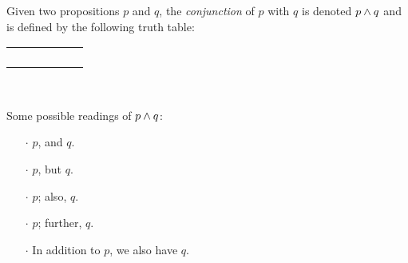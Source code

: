 \begin{definition}[Conjunction]
    \begin{center}
        \begin{minipage}[t]{.55\linewidth}
            Given two propositions \(p\) and \(q\), the \emph{conjunction} of \(p\) with \(q\)
            is denoted \(p \wedge q\) and is defined by the following truth table:
            \begin{table}[H]
                \centering
                \label{tab:and}
                \begin{tabular}{|CcCc||Cc|}
                    \hline
                     &  &  \\ \hline
                    \thead{\(\top\)} & \thead{\(\top\)} &  \\
                    \thead{\(\top\)} & \thead{\(\bot\)} &  \\
                    \thead{\(\bot\)} & \thead{\(\top\)} &  \\
                    \thead{\(\bot\)} & \thead{\(\bot\)} &  \\ \hline
                \end{tabular}
            \end{table}
        \end{minipage}%
        \begin{minipage}[t]{.05\linewidth}
            ~
        \end{minipage}%
        \begin{minipage}[t]{.4\linewidth}
            Some possible readings of \(p \wedge q\):\\
            \begin{itemize}
                \item[\(\cdot\)]
                    \(p\), and \(q\).
                \item[\(\cdot\)]
                    \(p\), but \(q\).
                \item[\(\cdot\)]
                    \(p\); also, \(q\).
                \item[\(\cdot\)]
                    \(p\); further, \(q\).
                \item[\(\cdot\)]
                    In addition to \(p\), we also have \(q\).
            \end{itemize}
        \end{minipage}
    \end{center}
\end{definition}


